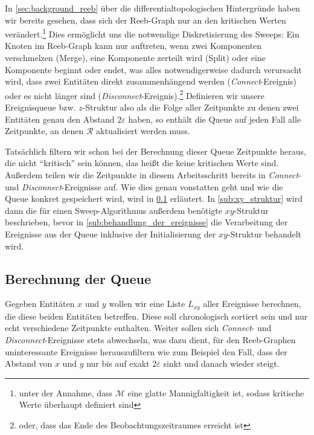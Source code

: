 In \cref{sec:background_reeb} über die differentialtopologischen Hintergründe haben wir bereits gesehen, dass sich der Reeb-Graph nur an den kritischen Werten verändert.\footnote{unter der Annahme, dass $\mathcal{M}$ eine glatte Mannigfaltigkeit ist, sodass kritische Werte überhaupt definiert sind}
Dies ermöglicht uns die notwendige Diskretisierung des Sweeps: Ein Knoten im Reeb-Graph kann nur auftreten, wenn zwei Komponenten verschmelzen (Merge), eine Komponente zerteilt wird (Split) oder eine Komponente beginnt oder endet, was alles notwendigerweise dadurch verursacht wird, dass zwei Entitäten direkt zusammenhängend werden (\emph{Connect}-Ereignis) oder es nicht länger sind (\emph{Disconnect}-Ereignis).\footnote{oder, dass das Ende des Beobachtungszeitraumes erreicht ist}
Definieren wir unsere Ereignisqueue bzw. $z$-Struktur also als die Folge aller Zeitpunkte zu denen zwei Entitäten genau den Abstand $2 \varepsilon$ haben, so enthält die Queue auf jeden Fall alle Zeitpunkte, an denen $\mathcal{R}$ aktualisiert werden muss.

Tatsächlich filtern wir schon bei der Berechnung dieser Queue Zeitpunkte heraus, die nicht \enquote{kritisch} sein können, das heißt die keine kritischen Werte sind.
Außerdem teilen wir die Zeitpunkte in diesem Arbeitsschritt bereits in \emph{Connect}- und \emph{Disconnect}-Ereignisse auf.
Wie dies genau vonstatten geht und wie die Queue konkret gespeichert wird, wird in \cref{sub:berechnung_queue} erläutert.
In \cref{sub:xy_struktur} wird dann die für einen Sweep-Algorithmus außerdem benötigte $xy$-Struktur beschrieben, bevor in \cref{sub:behandlung_der_ereignisse} die Verarbeitung der Ereignisse aus der Queue inklusive der Initialisierung der $xy$-Struktur behandelt wird.


\subsection{Berechnung der Queue} %
\label{sub:berechnung_queue}
Gegeben Entitäten $x$ und $y$ wollen wir eine Liste $L_{xy}$ aller Ereignisse berechnen, die diese beiden Entitäten betreffen.
Diese soll chronologisch sortiert sein und nur echt verschiedene Zeitpunkte enthalten.
Weiter sollen sich \emph{Connect}- und \emph{Disconnect}-Ereignisse stets abwechseln, was dazu dient, für den Reeb-Graphen uninteressante Ereignisse herauszufiltern wie zum Beispiel den Fall, dass der Abstand von $x$ und $y$ nur bis auf exakt $2 \varepsilon$ sinkt und danach wieder steigt.

